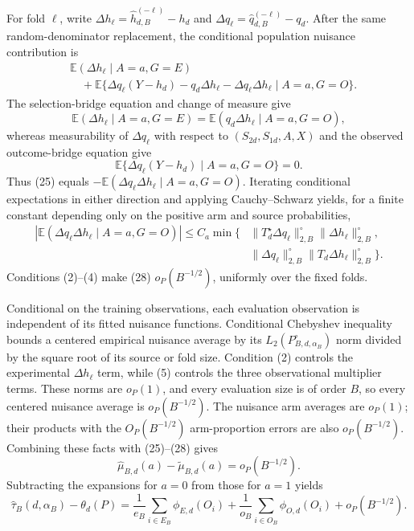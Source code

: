 For fold \(\ell\), write \(\Delta h_\ell=\widehat h_{d,B}^{(-\ell)}-h_d\) and \(\Delta q_\ell=\widehat q_{d,B}^{(-\ell)}-q_d\).  After the same random-denominator replacement, the conditional population nuisance contribution is
\[
\begin{aligned}
&\mathbb E(\Delta h_\ell\mid A=a,G=E)\\
&\quad+\mathbb E\{\Delta q_\ell(Y-h_d)-q_d\Delta h_\ell
-\Delta q_\ell\Delta h_\ell\mid A=a,G=O\}.
\end{aligned}                                                       \tag{25}
\]
The selection-bridge equation and change of measure give
\[
\mathbb E(\Delta h_\ell\mid A=a,G=E)
=\mathbb E(q_d\Delta h_\ell\mid A=a,G=O),                         \tag{26}
\]
whereas measurability of \(\Delta q_\ell\) with respect to \((S_{2d},S_{1d},A,X)\) and the observed outcome-bridge equation give
\[
\mathbb E\{\Delta q_\ell(Y-h_d)\mid A=a,G=O\}=0.                \tag{27}
\]
Thus (25) equals \(-\mathbb E(\Delta q_\ell\Delta h_\ell\mid A=a,G=O)\).  Iterating conditional expectations in either direction and applying Cauchy--Schwarz yields, for a finite constant depending only on the positive arm and source probabilities,
\[
\begin{aligned}
|\mathbb E(\Delta q_\ell\Delta h_\ell\mid A=a,G=O)|
\le C_a\min\{&
\|T_d^\star\Delta q_\ell\|_{2,B}^{\circ}
\|\Delta h_\ell\|_{2,B}^{\circ},\\
&\|\Delta q_\ell\|_{2,B}^{\circ}
\|T_d\Delta h_\ell\|_{2,B}^{\circ}\}.
\end{aligned}                                                       \tag{28}
\]
Conditions (2)--(4) make (28) \(o_P(B^{-1/2})\), uniformly over the fixed folds.

Conditional on the training observations, each evaluation observation is independent of its fitted nuisance functions.  Conditional Chebyshev inequality bounds a centered empirical nuisance average by its \(L_2(P_{B,d,\alpha_B}^{\circ})\) norm divided by the square root of its source or fold size.  Condition (2) controls the experimental \(\Delta h_\ell\) term, while (5) controls the three observational multiplier terms.  These norms are \(o_P(1)\), and every evaluation size is of order \(B\), so every centered nuisance average is \(o_P(B^{-1/2})\).  The nuisance arm averages are \(o_P(1)\); their products with the \(O_P(B^{-1/2})\) arm-proportion errors are also \(o_P(B^{-1/2})\).  Combining these facts with (25)--(28) gives
\[
\widehat\mu_{B,d}(a)-\widetilde\mu_{B,d}(a)=o_P(B^{-1/2}).        \tag{29}
\]
Subtracting the expansions for \(a=0\) from those for \(a=1\) yields
\[
\widehat\tau_B(d,\alpha_B)-\theta_d(P)
=\frac1{e_B}\sum_{i\in E_B}\phi_{E,d}(O_i)
+\frac1{o_B}\sum_{i\in O_B}\phi_{O,d}(O_i)
+o_P(B^{-1/2}).                                                     \tag{30}
\]

